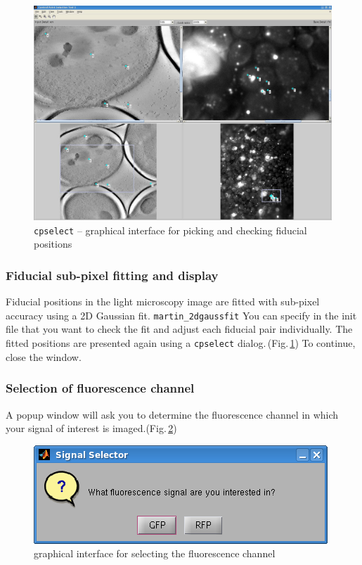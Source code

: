 \documentclass[10pt,a4paper,onepage,DIV12]{scrartcl}
\begin{document}
\begin{figure}
 \centering
 \includegraphics[width=.78\textwidth]{images/cpsel_fid1.jpg}
 \caption{\texttt{cpselect} -- graphical interface for picking and checking fiducial positions}
 \label{fig:cpsel_fid1}
\end{figure}

\subsubsection{Fiducial sub-pixel fitting and display}
Fiducial positions in the light microscopy image are fitted with sub-pixel accuracy using a  2D Gaussian fit. \texttt{martin\_2dgaussfit}
You can specify in the init file that you want to check the fit and adjust each fiducial pair individually.
The fitted positions are presented again using a \texttt{cpselect} dialog.\,(Fig.\,\ref{fig:cpsel_fid1}) To continue, close the window.

 

\subsubsection{Selection of fluorescence channel}
A popup window will ask you to determine the fluorescence channel in which your signal of interest is imaged.(Fig.\,\ref{fig:fluorsel})

\begin{figure}
 \centering
 \includegraphics[width=.38\textwidth]{images/fluorsel.png}
\caption{graphical interface for selecting the fluorescence channel}
 \label{fig:fluorsel}
\end{figure}
\end{document}

